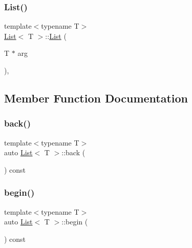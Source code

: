 \mbox{\label{struct_list_ac1fba3a80d1d7fffbd2c1853a624f40a}} 
\subsubsection{\texorpdfstring{List()}{List()}\hspace{0.1cm}{\footnotesize\ttfamily [2/2]}}
{\footnotesize\ttfamily template$<$typename T$>$ \\
\hyperlink{struct_list}{List}$<$ T $>$\+::\hyperlink{struct_list}{List} (\begin{DoxyParamCaption}\item[{T $\ast$}]{arg }\end{DoxyParamCaption})\hspace{0.3cm}{\ttfamily [inline]}, {\ttfamily [explicit]}}



\subsection{Member Function Documentation}
\mbox{\label{struct_list_a6949268f152305afc5bac0ee3e5bb838}} 
\subsubsection{\texorpdfstring{back()}{back()}}
{\footnotesize\ttfamily template$<$typename T$>$ \\
auto \hyperlink{struct_list}{List}$<$ T $>$\+::back (\begin{DoxyParamCaption}{ }\end{DoxyParamCaption}) const\hspace{0.3cm}{\ttfamily [inline]}}

\mbox{\label{struct_list_afa6f9828eab89e2fcae63b612927fabb}} 
\subsubsection{\texorpdfstring{begin()}{begin()}}
{\footnotesize\ttfamily template$<$typename T$>$ \\
auto \hyperlink{struct_list}{List}$<$ T $>$\+::begin (\begin{DoxyParamCaption}{ }\end{DoxyParamCaption}) const\hspace{0.3cm}{\ttfamily [inline]}}

